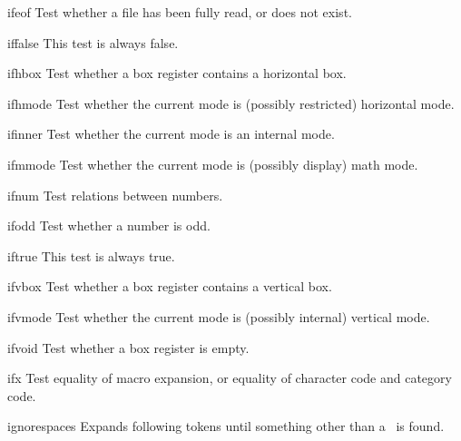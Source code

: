 \item ifeof
      Test whether a file has been fully read, or does not exist.

\item iffalse
      This test is always false.

\item ifhbox
      Test whether a box register contains a horizontal box.

\item ifhmode
      Test whether the current mode is (possibly restricted) horizontal mode.

\item ifinner
      Test whether the current mode is an internal mode.

\item ifmmode
      Test whether the current mode is (possibly display) math mode.

\item ifnum
      Test relations between numbers.

\item ifodd
      Test whether a number is odd.

\item iftrue
      This test is always true.

\item ifvbox
      Test whether a box register contains a vertical box. 

\item ifvmode
      Test whether the current mode is (possibly internal) vertical mode.

\item ifvoid
      Test whether a box register is empty.

\item ifx
      Test equality of macro expansion, or equality of character code and
      category code.

\item ignorespaces  
      Expands following tokens until something other
      than a~ is found.

